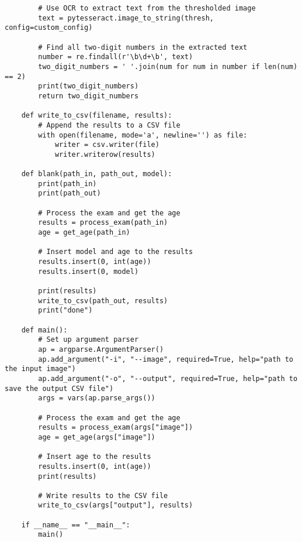 \begin{lstlisting}
        # Use OCR to extract text from the thresholded image
        text = pytesseract.image_to_string(thresh, config=custom_config)
        
        # Find all two-digit numbers in the extracted text
        number = re.findall(r'\b\d+\b', text)
        two_digit_numbers = ' '.join(num for num in number if len(num) == 2)
        print(two_digit_numbers)
        return two_digit_numbers
    
    def write_to_csv(filename, results):
        # Append the results to a CSV file
        with open(filename, mode='a', newline='') as file:
            writer = csv.writer(file)
            writer.writerow(results)
    
    def blank(path_in, path_out, model):
        print(path_in)
        print(path_out)
        
        # Process the exam and get the age
        results = process_exam(path_in)
        age = get_age(path_in)
        
        # Insert model and age to the results
        results.insert(0, int(age))
        results.insert(0, model)
        
        print(results)
        write_to_csv(path_out, results)
        print("done")
    
    def main():
        # Set up argument parser
        ap = argparse.ArgumentParser()
        ap.add_argument("-i", "--image", required=True, help="path to the input image")
        ap.add_argument("-o", "--output", required=True, help="path to save the output CSV file")
        args = vars(ap.parse_args())
        
        # Process the exam and get the age
        results = process_exam(args["image"])
        age = get_age(args["image"])
        
        # Insert age to the results
        results.insert(0, int(age))
        print(results)
        
        # Write results to the CSV file
        write_to_csv(args["output"], results)
    
    if __name__ == "__main__":
        main()    
\end{lstlisting}

